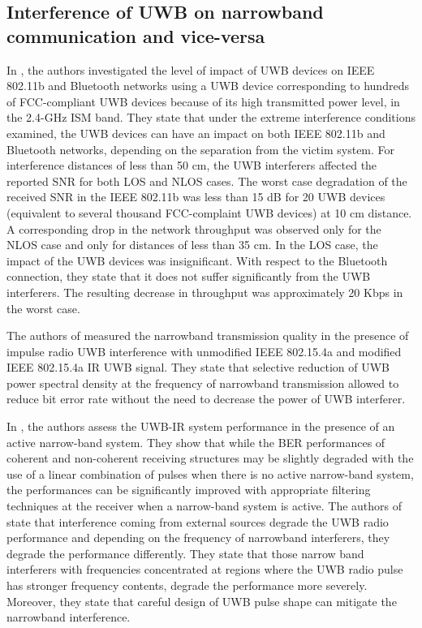 \subsection{Interference of UWB on narrowband communication and vice-versa}
In \cite{hamalainen2003ultra}, the authors investigated the level of impact of UWB devices on IEEE 802.11b and Bluetooth networks using a UWB device corresponding to hundreds of FCC-compliant UWB devices because of its high transmitted power level, in the 2.4-GHz ISM band. They state that under the extreme interference conditions examined, the UWB devices can have an impact on both IEEE 802.11b and Bluetooth networks, depending on the separation from the victim system. For interference distances of less than 50 cm, the UWB interferers affected the reported SNR for both LOS and NLOS cases. The worst case degradation of the received SNR in the IEEE 802.11b was less than 15 dB for 20 UWB devices (equivalent to several thousand FCC-complaint UWB devices) at 10 cm distance. A corresponding drop in the network throughput was observed only for the NLOS case and only for distances of less than 35 cm. In the LOS case, the impact of the UWB devices was insignificant. With respect to the Bluetooth connection, they state that it does not suffer significantly from the UWB interferers. The resulting decrease in throughput was approximately 20 Kbps in the worst case.

The authors of \cite{sadowski2011narrowband} measured the narrowband transmission quality in the presence of impulse radio UWB interference with unmodified IEEE 802.15.4a and modified IEEE 802.15.4a IR UWB signal. They state that selective reduction of UWB power spectral density at the frequency of narrowband transmission allowed to reduce bit error rate without the need to decrease the power of UWB interferer. 

In \cite{findikli2011performance}, the authors assess the UWB-IR system performance in the presence of an active narrow-band system. They show that while the BER performances of coherent and non-coherent receiving structures may be slightly degraded with the use of a linear combination of pulses when there is no active narrow-band system, the performances can be significantly improved with appropriate filtering techniques at the receiver when a narrow-band system is active. The authors of \cite{taha2002theoretical} state that interference coming from external sources degrade the UWB radio performance and depending on the frequency of narrowband interferers, they degrade the performance differently. They state that those narrow band interferers with frequencies concentrated at regions where the UWB radio pulse has stronger frequency contents, degrade the performance more severely. Moreover, they state that careful design of UWB pulse shape can mitigate the narrowband interference.

